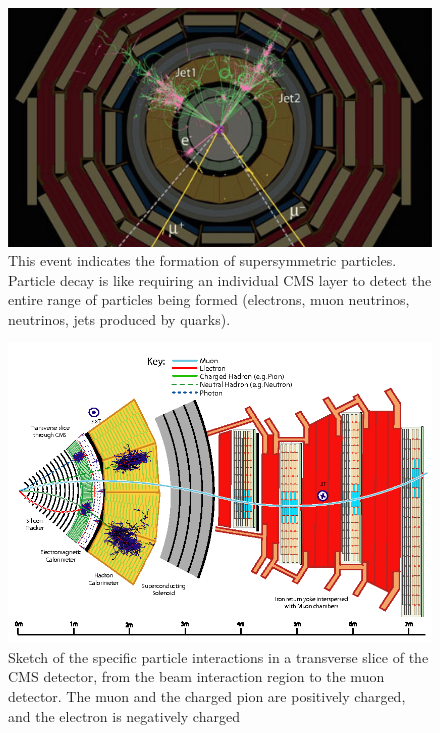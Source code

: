 \begin{figure}[h]
    \centering
    \includegraphics[scale=0.3]{Detector/SusyAny.jpg}
    \caption{This event indicates the formation of  supersymmetric particles. Particle decay  is like requiring an individual CMS layer  to detect the entire range of particles being formed (electrons, muon neutrinos, neutrinos, jets produced by quarks).\cite{CMS_3}}
    \label{fig:my_label_detect}
\end{figure}

\begin{figure}[h]
    \centering
    \includegraphics[scale=0.3]{Detector/Figure_001.png}
    \caption{Sketch of the specific particle interactions in a transverse slice of the CMS detector, from the beam interaction region to the muon detector. The muon and the charged pion are positively charged, and the electron is negatively charged\cite{CMS_3}}
    \label{fig:my_label_CMS}
\end{figure}

